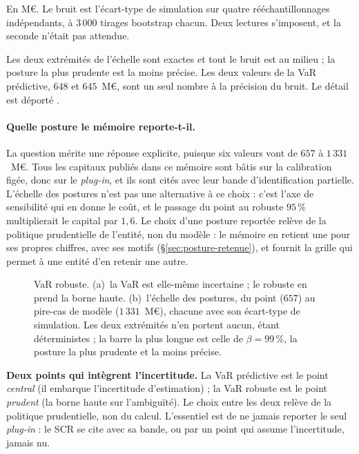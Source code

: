 \vspace{4pt}
\noindent En M\euro. Le bruit est l'écart-type de simulation sur quatre rééchantillonnages
indépendants, à $3\,000$ tirages bootstrap chacun. Deux lectures s'imposent, et la seconde
n'était pas attendue.

Les deux extrémités de l'échelle sont exactes et tout le bruit est au milieu ; la posture la
plus prudente est la moins précise. Les deux valeurs de la VaR prédictive, $648$ et $645$~M\euro,
sont un seul nombre à la précision du bruit. Le détail est déporté \matcomp.

\paragraph{Quelle posture le mémoire reporte-t-il.} La question mérite une réponse explicite,
puisque six valeurs vont de $657$ à $1\,331$~M\euro. Tous les capitaux publiés dans ce mémoire
sont bâtis sur la calibration figée, donc sur le \emph{plug-in}, et ils sont cités avec
leur bande d'identification partielle. L'échelle des postures n'est pas une alternative à ce
choix : c'est l'axe de sensibilité qui en donne le coût, et le passage du point au robuste
$95\,\%$ multiplierait le capital par $1{,}6$. Le choix d'une posture reportée relève de la
politique prudentielle de l'entité, non du modèle : le mémoire en retient une pour ses propres
chiffres, avec ses motifs (\S\ref{sec:posture-retenue}), et fournit la grille qui permet à une
entité d'en retenir une autre.

\begin{figure}[htbp]\centering
{}
\caption{VaR robuste. (a)~la VaR est elle-même incertaine ; le robuste en prend la
borne haute. (b)~l'échelle des postures, du point ($657$) au pire-cas de modèle
($1\,331$~M\euro), chacune avec son écart-type de simulation. Les deux extrémités n'en
portent aucun, étant déterministes ; la barre la plus longue est celle de $\beta=99\,\%$, la
posture la plus prudente et la moins précise.}
\label{fig:robuste}
\end{figure}

\begin{cle}
\textbf{Deux points qui intègrent l'incertitude.} La VaR prédictive est le point
\emph{central} (il embarque l'incertitude d'estimation) ; la VaR robuste est le point
\emph{prudent} (la borne haute sur l'ambiguïté). Le choix entre les deux relève de la politique
prudentielle, non du calcul. L'essentiel est de ne jamais reporter le seul \emph{plug-in} : le
SCR se cite avec sa bande, ou par un point qui assume l'incertitude, jamais nu.
\end{cle}

